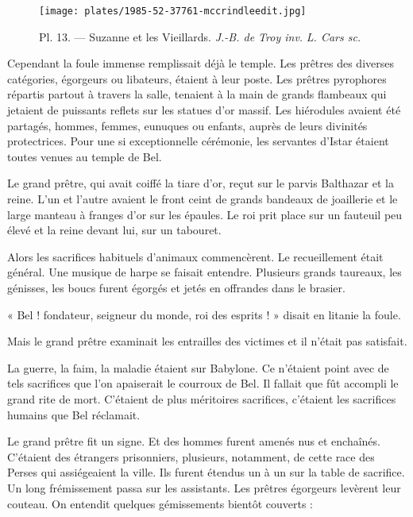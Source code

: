 \documentclass[a4paper, 11pt, oneside, polutonikogreek, french]{article}
\begin{document}
\bigskip
\centerline{\EightStarTaper}
\centerline{\EightStarTaper\EightStarTaper}
\bigskip
\clearpage
\vspace*{\fill}
\begin{figure}[H]
\centering
\texttt{[image: plates/1985-52-37761-mccrindleedit.jpg]}
\caption{Pl. 13. --- Suzanne et les Vieillards. \emph{J.-B. de Troy inv.} \emph{L. Cars sc.}}
\end{figure}
\vspace*{\fill}
\clearpage
Cependant la foule immense remplissait déjà le temple. Les prêtres des diverses catégories, égorgeurs ou libateurs, étaient à leur poste. Les prêtres pyrophores répartis partout à travers la salle, tenaient à la main de grands flambeaux qui jetaient de puissants reflets sur les statues d'or massif. Les hiérodules avaient été partagés, hommes, femmes, eunuques ou enfants, auprès de leurs divinités protectrices. Pour une si exceptionnelle cérémonie, les servantes d'Istar étaient toutes venues au temple de Bel.

Le grand prêtre, qui avait coiffé la tiare d'or, reçut sur le parvis Balthazar et la reine. L'un et l'autre avaient le front ceint de grands bandeaux de joaillerie et le large manteau à franges d'or sur les épaules. Le roi prit place sur un fauteuil peu élevé et la reine devant lui, sur un tabouret.

\bigskip
\centerline{\EightStarTaper}
\centerline{\EightStarTaper\EightStarTaper}
\bigskip

Alors les sacrifices habituels d'animaux commencèrent. Le recueillement était général. Une musique de harpe se faisait entendre. Plusieurs grands taureaux, les génisses, les boucs furent égorgés et jetés en offrandes dans le brasier.

« Bel ! fondateur, seigneur du monde, roi des esprits ! » disait en litanie la foule.

Mais le grand prêtre examinait les entrailles des victimes et il n'était pas satisfait.

La guerre, la faim, la maladie étaient sur Babylone. Ce n'étaient point avec de tels sacrifices que l'on apaiserait le courroux de Bel. Il fallait que fût accompli le grand rite de mort. C'étaient de plus méritoires sacrifices, c'étaient les sacrifices humains que Bel réclamait.

\bigskip
\centerline{\EightStarTaper}
\centerline{\EightStarTaper\EightStarTaper}
\bigskip

Le grand prêtre fit un signe. Et des hommes furent amenés nus et enchaînés. C'étaient des étrangers prisonniers, plusieurs, notamment, de cette race des Perses qui assiégeaient la ville. Ils furent étendus un à un sur la table de sacrifice. Un long frémissement passa sur les assistants. Les prêtres égorgeurs levèrent leur couteau. On entendit quelques gémissements bientôt couverts :
\end{document}
